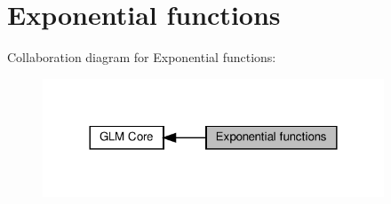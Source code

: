 \hypertarget{group__core__func__exponential}{}\section{Exponential functions}
\label{group__core__func__exponential}
Collaboration diagram for Exponential functions\+:\nopagebreak
\begin{figure}[H]
\begin{center}
\leavevmode
\includegraphics[width=288pt]{group__core__func__exponential}
\end{center}
\end{figure}
